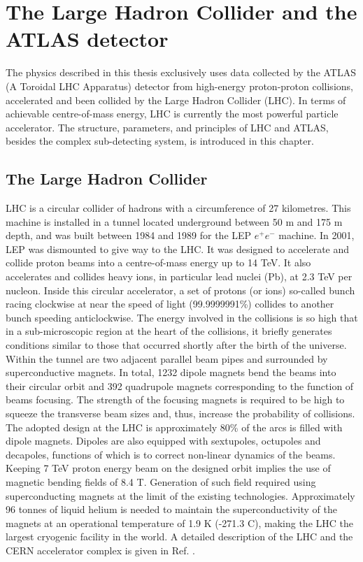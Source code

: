 \newpage
\chapter{The Large Hadron Collider and the ATLAS detector}
\label{LHC&ATLAS}

The physics described in this thesis exclusively uses data collected by the ATLAS (A Toroidal LHC Apparatus) detector from high-energy proton-proton collisions, accelerated and been collided by the Large Hadron Collider (LHC). In terms of achievable centre-of-mass energy, LHC is currently the most powerful particle accelerator. The structure, parameters, and principles of LHC and ATLAS, besides the complex sub-detecting system, is introduced in this chapter.

\section{The Large Hadron Collider}
\label{chap2:LHC}
LHC is a circular collider of hadrons with a circumference of 27 kilometres. This machine is installed in a tunnel located underground between 50 m and 175 m depth, and was built between 1984 and 1989 for the LEP $e^+e^-$ machine. In 2001, LEP was dismounted to give way to the LHC. It was designed to accelerate and collide proton beams into a centre-of-mass energy up to 14 TeV. It also accelerates and collides heavy ions, in particular lead nuclei (Pb), at 2.3 TeV per nucleon. Inside this circular accelerator, a set of protons (or ions) so-called bunch racing clockwise at near the speed of light (99.9999991\%) collides to another bunch speeding anticlockwise. The energy involved in the collisions is so high that in a sub-microscopic region at the heart of the collisions, it briefly generates conditions similar to those that occurred shortly after the birth of the universe. \\ 
Within the tunnel are two adjacent parallel beam pipes and surrounded by superconductive magnets. In total, 1232 dipole magnets bend the beams into their circular orbit and 392 quadrupole magnets corresponding to the function of beams focusing. The strength of the focusing magnets is required to be high to squeeze the transverse beam sizes and, thus, increase the probability of collisions. The adopted design at the LHC is approximately 80\% of the arcs is filled with dipole magnets. Dipoles are also equipped with sextupoles, octupoles and decapoles, functions of which is to correct non-linear dynamics of the beams.  Keeping 7 TeV proton energy beam on the designed orbit implies the use of magnetic bending fields of 8.4 T. Generation of such field required using superconducting magnets at the limit of the existing technologies. Approximately 96 tonnes of liquid helium is needed to maintain the superconductivity of the magnets at an operational temperature of 1.9 K (-271.3 C), making the LHC the largest cryogenic facility in the world.  A detailed description of the LHC and the CERN accelerator complex is given in Ref. \cite{LHCTDR}.

